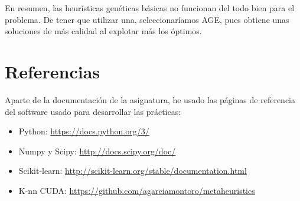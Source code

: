 En resumen, las heurísticas genéticas básicas no funcionan del todo bien para el problema. De tener que utilizar una, seleccionaríamos AGE, pues obtiene unas soluciones de más calidad al explotar más los óptimos.\\

\newpage
\section{Referencias}
Aparte de la documentación de la asignatura, he usado las páginas de referencia del software usado para desarrollar las prácticas:
\begin{itemize}
\item Python:  \url{https://docs.python.org/3/}
\item Numpy y Scipy: \url{http://docs.scipy.org/doc/}
\item Scikit-learn: \url{http://scikit-learn.org/stable/documentation.html}
\item K-nn CUDA: \url{https://github.com/agarciamontoro/metaheuristics}
\end{itemize}
\newpage
\newpage
